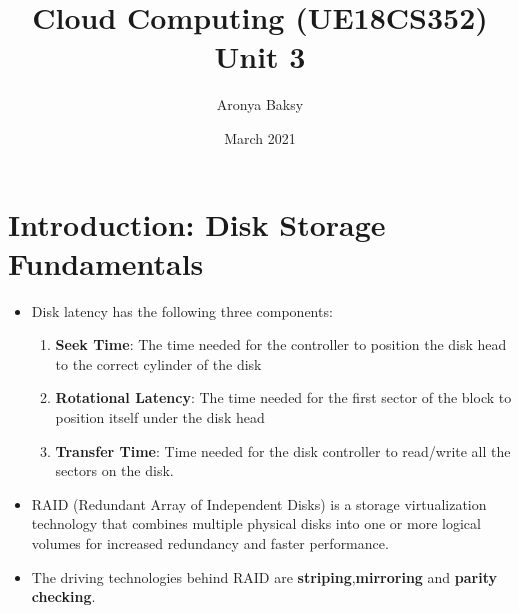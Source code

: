 \documentclass{article}
\title{Cloud Computing (UE18CS352) \\Unit 3}
\author{Aronya Baksy}
\date{March 2021}
\begin{document}
\maketitle
\section{Introduction: Disk Storage Fundamentals}
\begin{itemize}
    \item Disk latency has the following three components:
    \begin{enumerate}
        \item \textbf{Seek Time}: The time needed for the controller to position the disk head to the correct cylinder of the disk
        
        \item \textbf{Rotational Latency}: The time needed for the first sector of the block to position itself under the disk head
        
        \item \textbf{Transfer Time}: Time needed for the disk controller to read/write all the sectors on the disk. 
    \end{enumerate}
    
    \item RAID (Redundant Array of Independent Disks) is a storage virtualization technology that combines multiple physical disks into one or more logical volumes for increased redundancy and faster performance. 
    
    \item The driving technologies behind RAID are \textbf{striping},\textbf{mirroring} and \textbf{parity checking}.
\end{itemize}
\end{document}

